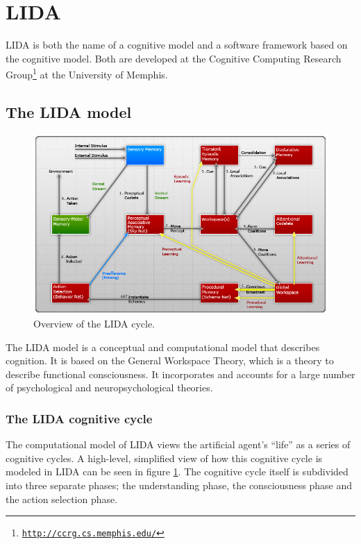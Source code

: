 
\section{LIDA}
\label{sec:lida}
LIDA is both the name of a cognitive model and a software framework based on the cognitive model. Both are developed at the Cognitive Computing Research Group\footnote{\href{http://ccrg.cs.memphis.edu/}{\tt http://ccrg.cs.memphis.edu/}} at the University of Memphis.

\subsection{The LIDA model}
\begin{figure}[h!tb]
\centering
\includegraphics[width=\textwidth]{graphics/lida-model.png}
\caption{Overview of the LIDA cycle.\cite{franklin2007lida}}
\label{fig:lida-cycle}
\end{figure}

The LIDA model is a conceptual and computational model that describes cognition. It is based on the General Workspace Theory, which is a theory to describe functional consciousness. It incorporates and accounts for a large number of psychological and neuropsychological theories.\cite{Franklin2012}

\subsubsection{The LIDA cognitive cycle}
The computational model of LIDA views the artificial agent's ``life'' as a series of cognitive cycles. A high-level, simplified view of how this cognitive cycle is modeled in LIDA can be seen in figure \ref{fig:lida-cycle}. The cognitive cycle itself is subdivided into three separate phases; the understanding phase, the consciousness phase and the action selection phase.

